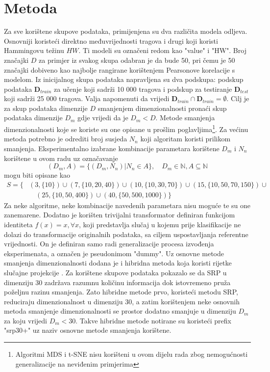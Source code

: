 \documentclass[times, utf8, diplomski]{fer}
\begin{document}
\section{Metoda}

Za sve korištene skupove podataka, primijenjena su dva različita modela odljeva. Osnovniji koristeći direktno međuvrijednosti tragova i drugi koji koristi Hammingovu težinu $HW$. Ti modeli su označeni redom kao "value" i "HW". Broj značajki $D$ za primjer iz svakog skupa odabran je da bude 50, pri čemu je 50 značajki dobiveno kao najbolje rangirane korištenjem Pearsonove korelacije s modelom. Iz inicijalnog skupa podataka napravljena su dva podskupa: podskup podataka $\bm{D}_{train}$ za učenje koji sadrži 10 000 tragova i podskup za testiranje $\bm{D}_{test}$ koji sadrži 25 000 tragova. Valja napomenuti da vrijedi $\bm{D}_{train} \cap \bm{D}_{train} = \emptyset$. Cilj je za skup podataka dimenzije $D$ smanjenjem dimenzionalnosti pronaći skup podataka dimenzije $D_m$ gdje vrijedi da je $D_m < D$.
Metode smanjenja dimenzionalnosti koje se koriste su one opisane u prošlim poglavljima\footnote{Algoritmi MDS i t-SNE nisu korišteni u ovom dijelu rada zbog nemogućnosti generalizacije na neviđenim primjerima}. Za većinu metoda potrebno je odrediti broj susjeda $N_n$ koji algoritam koristi prilikom smanjenja. Eksperimentalno izabrane kombinacije parametara korištene $D_m$ i $N_n$ korištene u ovom radu uz označavanje
\[(D_m, A) = \{(D_m, N_n) | N_n \in A\}, \quad D_m \in \mathbb{N}, A \subseteq \mathbb{N} \]
mogu biti opisane kao
\begin{align*}
    S = \{
     & (3, \{10\}) \cup
    (7, \{10, 20, 40\}) \cup
    (10, \{10, 30, 70\}) \cup
    (15, \{10, 50, 70, 150\}) \cup     \\
     & \quad(25, \{10, 50, 400\}) \cup
    (40, \{50, 500, 1000\})
    \}
\end{align*} Za neke algoritme, neke kombinacije navedenih parametara nisu moguće te su one zanemarene. Dodatno je korišten trivijalni transformator definiran funkcijom identiteta $f(x) = x, \forall x$, koji predstavlja slučaj u kojemu prije klasifikacije ne dolazi do transformacije originalnih podataka, sa ciljem uspostavljanja referentne vrijednosti. On je definiran samo radi generalizacije procesa izvođenja eksperimenata, a označen je pseudonimom "dummy". Uz osnovne metode smanjenja dimenzionalnosti dodana je i hibridna metoda koja koristi rijetke slučajne projekcije . Za korištene skupove podataka pokazalo se da SRP u dimenziju 30 zadržava razumnu količinu informacija dok istovremeno pruža poželjnu razinu smanjenja. Zato hibridne metode prvo, koristeći metodu SRP, reduciraju dimenzionalnost u dimenziju 30, a zatim korištenjem neke osnovnih metoda smanjenje dimenzionalnosti se prostor dodatno smanjuje u dimenziju $D_m$ za koju vrijedi $D_m < 30$. Takve hibridne metode notirane su koristeći prefix "srp30+" uz naziv osnovne metode smanjenja korištene.
\end{document}
